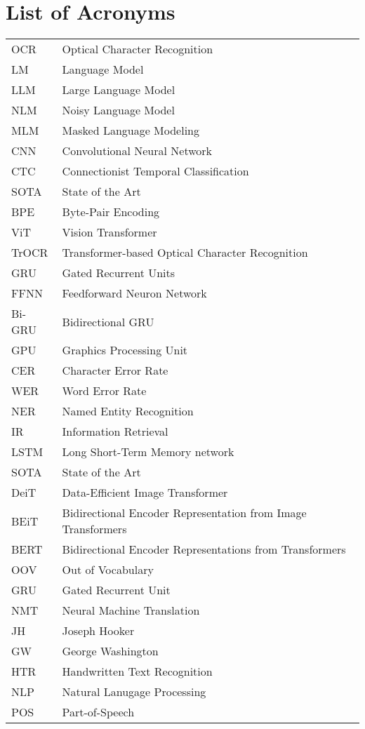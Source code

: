 {}
\chapter*{List of Acronyms}

\begin{supertabular}{lp{12.5cm}}
OCR & Optical Character Recognition\\
LM & Language Model\\
LLM & Large Language Model\\
NLM & Noisy Language Model\\
MLM & Masked Language Modeling\\
CNN & Convolutional Neural Network\\
CTC & Connectionist Temporal Classification\\
SOTA & State of the Art\\
BPE & Byte-Pair Encoding\\
ViT & Vision Transformer\\
TrOCR & Transformer-based Optical Character Recognition\\
GRU & Gated Recurrent Units\\
FFNN & Feedforward Neuron Network\\
Bi-GRU & Bidirectional GRU\\
GPU & Graphics Processing Unit\\
CER & Character Error Rate\\
WER & Word Error Rate\\
NER & Named Entity Recognition\\
IR & Information Retrieval\\
LSTM & Long Short-Term Memory network\\
SOTA & State of the Art\\
DeiT & Data-Efficient Image Transformer\\
BEiT & Bidirectional Encoder Representation from Image Transformers\\
BERT & Bidirectional Encoder Representations from Transformers\\
OOV & Out of Vocabulary\\
GRU & Gated Recurrent Unit\\
NMT & Neural Machine Translation\\
JH & Joseph Hooker\\
GW & George Washington\\
HTR & Handwritten Text Recognition\\
NLP & Natural Lanugage Processing\\
POS & Part-of-Speech\\
\end{supertabular}

\newpage